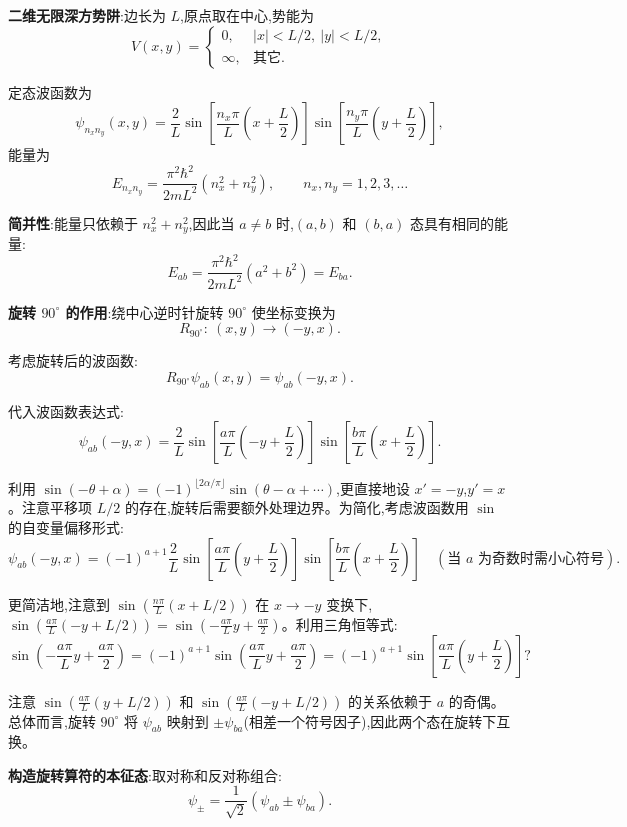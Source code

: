 \begin{solution}
	\textbf{二维无限深方势阱}:边长为 $L$,原点取在中心,势能为
	\[
	V(x,y) = \begin{cases}
	0, & |x|<L/2,\ |y|<L/2,\\
	\infty, & \text{其它}.
	\end{cases}
	\]

	定态波函数为
	\[
	\psi_{n_x n_y}(x,y) = \frac{2}{L}\sin\!\left[\frac{n_x\pi}{L}\left(x+\frac{L}{2}\right)\right]
	\sin\!\left[\frac{n_y\pi}{L}\left(y+\frac{L}{2}\right)\right],
	\]
	能量为
	\[
	E_{n_x n_y} = \frac{\pi^2\hbar^2}{2mL^2}(n_x^2+n_y^2),\qquad n_x,n_y=1,2,3,\ldots
	\]

	\textbf{简并性}:能量只依赖于 $n_x^2+n_y^2$,因此当 $a\neq b$ 时,$(a,b)$ 和 $(b,a)$ 态具有相同的能量:
	\[
	E_{ab} = \frac{\pi^2\hbar^2}{2mL^2}(a^2+b^2) = E_{ba}.
	\]

	\textbf{旋转 $90^\circ$ 的作用}:绕中心逆时针旋转 $90^\circ$ 使坐标变换为
	\[
	R_{90^\circ}:\ (x,y) \longrightarrow (-y,x).
	\]

	考虑旋转后的波函数:
	\[
	R_{90^\circ}\psi_{ab}(x,y) = \psi_{ab}(-y,x).
	\]

	代入波函数表达式:
	\[
	\psi_{ab}(-y,x)=\frac{2}{L}\sin\!\left[\frac{a\pi}{L}\left(-y+\frac{L}{2}\right)\right]
	\sin\!\left[\frac{b\pi}{L}\left(x+\frac{L}{2}\right)\right].
	\]

	利用 $\sin(-\theta+\alpha) = (-1)^{\lfloor 2\alpha/\pi\rfloor}\sin(\theta-\alpha+\cdots)$,更直接地设 $x'=-y$,$y'=x$。注意平移项 $L/2$ 的存在,旋转后需要额外处理边界。为简化,考虑波函数用 $\sin$ 的自变量偏移形式:
	\[
	\psi_{ab}(-y,x) = (-1)^{a+1}\frac{2}{L}\sin\!\left[\frac{a\pi}{L}\left(y+\frac{L}{2}\right)\right]
	\sin\!\left[\frac{b\pi}{L}\left(x+\frac{L}{2}\right)\right] \quad (\text{当 } a\text{ 为奇数时需小心符号}).
	\]

	更简洁地,注意到 $\sin(\frac{n\pi}{L}(x+L/2))$ 在 $x\to -y$ 变换下,$\sin(\frac{a\pi}{L}(-y+L/2)) = \sin(-\frac{a\pi}{L}y+\frac{a\pi}{2})$。利用三角恒等式:
	\[
	\sin\!\left(-\frac{a\pi}{L}y+\frac{a\pi}{2}\right) = (-1)^{a+1}\sin\!\left(\frac{a\pi}{L}y+\frac{a\pi}{2}\right) = (-1)^{a+1}\sin\!\left[\frac{a\pi}{L}\left(y+\frac{L}{2}\right)\right]?
	\]

	注意 $\sin(\frac{a\pi}{L}(y+L/2))$ 和 $\sin(\frac{a\pi}{L}(-y+L/2))$ 的关系依赖于 $a$ 的奇偶。总体而言,旋转 $90^\circ$ 将 $\psi_{ab}$ 映射到 $\pm\psi_{ba}$(相差一个符号因子),因此两个态在旋转下互换。

	\textbf{构造旋转算符的本征态}:取对称和反对称组合:
	\[
	\psi_\pm = \frac{1}{\sqrt{2}}(\psi_{ab}\pm\psi_{ba}).
	\]


\end{solution}
